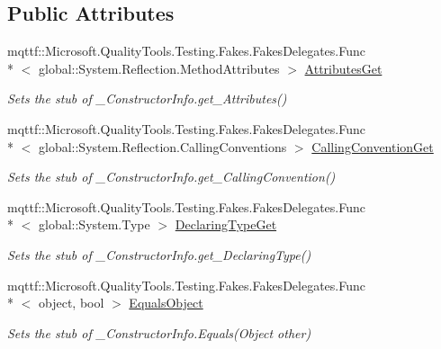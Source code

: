 \subsection*{Public Attributes}
\begin{DoxyCompactItemize}
\item 
mqttf\-::\-Microsoft.\-Quality\-Tools.\-Testing.\-Fakes.\-Fakes\-Delegates.\-Func\\*
$<$ global\-::\-System.\-Reflection.\-Method\-Attributes $>$ \hyperlink{class_system_1_1_runtime_1_1_interop_services_1_1_fakes_1_1_stub___constructor_info_aede583304698b05e9448903b2e86a44d}{Attributes\-Get}
\begin{DoxyCompactList}\small\item\em Sets the stub of \-\_\-\-Constructor\-Info.\-get\-\_\-\-Attributes()\end{DoxyCompactList}\item 
mqttf\-::\-Microsoft.\-Quality\-Tools.\-Testing.\-Fakes.\-Fakes\-Delegates.\-Func\\*
$<$ global\-::\-System.\-Reflection.\-Calling\-Conventions $>$ \hyperlink{class_system_1_1_runtime_1_1_interop_services_1_1_fakes_1_1_stub___constructor_info_a83e0faa5249113bdfefa090490009cfc}{Calling\-Convention\-Get}
\begin{DoxyCompactList}\small\item\em Sets the stub of \-\_\-\-Constructor\-Info.\-get\-\_\-\-Calling\-Convention()\end{DoxyCompactList}\item 
mqttf\-::\-Microsoft.\-Quality\-Tools.\-Testing.\-Fakes.\-Fakes\-Delegates.\-Func\\*
$<$ global\-::\-System.\-Type $>$ \hyperlink{class_system_1_1_runtime_1_1_interop_services_1_1_fakes_1_1_stub___constructor_info_a1eb244a5c2585282594fb4e58bd11649}{Declaring\-Type\-Get}
\begin{DoxyCompactList}\small\item\em Sets the stub of \-\_\-\-Constructor\-Info.\-get\-\_\-\-Declaring\-Type()\end{DoxyCompactList}\item 
mqttf\-::\-Microsoft.\-Quality\-Tools.\-Testing.\-Fakes.\-Fakes\-Delegates.\-Func\\*
$<$ object, bool $>$ \hyperlink{class_system_1_1_runtime_1_1_interop_services_1_1_fakes_1_1_stub___constructor_info_ad4e31c70650168667292873983fb7b53}{Equals\-Object}
\begin{DoxyCompactList}\small\item\em Sets the stub of \-\_\-\-Constructor\-Info.\-Equals(\-Object other)\end{DoxyCompactList}\item 

\end{DoxyCompactItemize}
